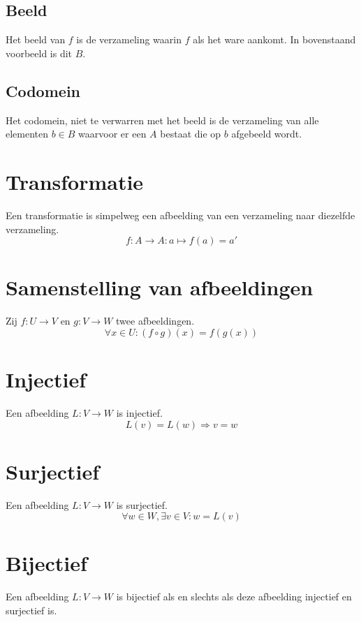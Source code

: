 \documentclass[lineaire_algebra_oplossingen.tex]{subfiles}
\begin{document}
\subsection{Beeld}
\label{beeld}
Het beeld van $f$ is de verzameling waarin $f$ als het ware aankomt. In bovenstaand voorbeeld is dit $B$.

\subsection{Codomein}
\label{codomein}
Het codomein, niet te verwarren met het beeld is de verzameling van alle elementen $b\in B$ waarvoor er een $A$ bestaat die op $b$ afgebeeld wordt.

\section{Transformatie}
Een transformatie is simpelweg een afbeelding van een verzameling naar diezelfde verzameling.
\[
f : A \rightarrow A : a \mapsto f(a)=a'
\]

\section{Samenstelling van afbeeldingen}
\label{samenstelling_van_afbeeldingen}
Zij $f: U \rightarrow V$ en $g: V\rightarrow W$ twee afbeeldingen.
\[
\forall x\in U: (f \circ g)(x) = f(g(x))
\]

\section{Injectief}
\label{injectief}
Een afbeelding $L: V \rightarrow W$ is injectief.
\[
L(v) = L(w) \Rightarrow v = w
\]

\section{Surjectief}
\label{surjectief}
Een afbeelding $L: V \rightarrow W$ is surjectief.
\[
\forall w \in W, \exists v \in V: w=L(v)
\]

\section{Bijectief}
\label{bijectief}
Een afbeelding $L: V \rightarrow W$ is bijectief als en slechts als deze afbeelding injectief en surjectief is.
\end{document}
